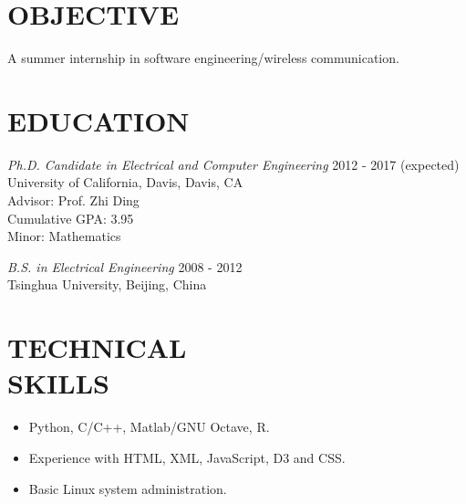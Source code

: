 \documentclass[margin]{res} %
\begin{document}
    \begin{resume}

     
        \section{OBJECTIVE}  
        A summer internship in software engineering/wireless communication.
    
    
        \section{EDUCATION}
    
        {\sl Ph.D. Candidate in Electrical and Computer Engineering} \hfill 2012 -
        2017 (expected) \\
        University of California, Davis, Davis, CA \\
        Advisor: Prof. Zhi Ding \\
        Cumulative GPA: 3.95 \\
        Minor: Mathematics 
        
        {\sl B.S. in Electrical Engineering}  \hfill 2008 - 2012\\
        Tsinghua University, Beijing, China
       
    
        \section{TECHNICAL \\ SKILLS}
        
        \begin{itemize}
            \item Python, C/C++, Matlab/GNU Octave, R.
            \item Experience with HTML, XML, JavaScript, D3 and CSS.
            \item Basic Linux system administration.
        \end{itemize} 
    

\end{resume}
\end{document}
